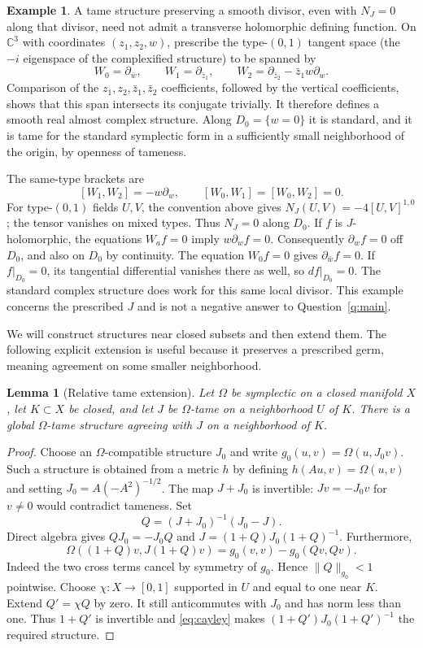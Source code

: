 \documentclass[11pt]{article}
\newtheorem{lemma}[theorem]{Lemma}
\theoremstyle{definition}
\newtheorem{example}[theorem]{Example}
\theoremstyle{remark}
\newcommand{\C}{\mathbb C}
\begin{document}
\begin{example}\label{ex:badJ}
A tame structure preserving a smooth divisor, even with $N_J=0$ along that divisor, need not admit a transverse holomorphic defining function.
On $\C^3$ with coordinates $(z_1,z_2,w)$, prescribe the type-$(0,1)$ tangent space (the $-i$ eigenspace of the complexified structure) to be spanned by
\[
 W_0=\partial_{\bar w},\qquad W_1=\partial_{\bar z_1},\qquad
 W_2=\partial_{\bar z_2}-\bar z_1w\partial_w.
\]
Comparison of the $z_1,z_2,\bar z_1,\bar z_2$ coefficients, followed by the vertical coefficients, shows that this span intersects its conjugate trivially. It therefore defines a smooth real almost complex structure. Along $D_0=\{w=0\}$ it is standard, and it is tame for the standard symplectic form in a sufficiently small neighborhood of the origin, by openness of tameness.

The same-type brackets are
\[
 [W_1,W_2]=-w\partial_w,\qquad [W_0,W_1]=[W_0,W_2]=0.
\]
For type-$(0,1)$ fields $U,V$, the convention above gives
$N_J(U,V)=-4[U,V]^{1,0}$; the tensor vanishes on mixed types. Thus $N_J=0$ along $D_0$. If $f$ is $J$-holomorphic, the equations $W_af=0$ imply $w\partial_wf=0$. Consequently $\partial_wf=0$ off $D_0$, and also on $D_0$ by continuity. The equation $W_0f=0$ gives $\partial_{\bar w}f=0$. If $f|_{D_0}=0$, its tangential differential vanishes there as well, so $df|_{D_0}=0$.
The standard complex structure does work for this same local divisor. This example concerns the prescribed $J$ and is not a negative answer to Question~\ref{q:main}.
\end{example}

We will construct structures near closed subsets and then extend them. The following explicit extension is useful because it preserves a prescribed germ, meaning agreement on some smaller neighborhood.

\begin{lemma}[Relative tame extension]\label{lem:extension}
Let $\Omega$ be symplectic on a closed manifold $X$, let $K\subset X$ be closed, and let $J$ be $\Omega$-tame on a neighborhood $U$ of $K$. There is a global $\Omega$-tame structure agreeing with $J$ on a neighborhood of $K$.
\end{lemma}
\begin{proof}
Choose an $\Omega$-compatible structure $J_0$ and write
$g_0(u,v)=\Omega(u,J_0v)$. Such a structure is obtained from a metric $h$ by defining $h(Au,v)=\Omega(u,v)$ and setting
$J_0=A(-A^2)^{-1/2}$.
The map $J+J_0$ is invertible: $Jv=-J_0v$ for $v\ne0$ would contradict tameness. Set
\[
 Q=(J+J_0)^{-1}(J_0-J).
\]
Direct algebra gives $QJ_0=-J_0Q$ and
$J=(1+Q)J_0(1+Q)^{-1}$. Furthermore,
\begin{equation}\label{eq:cayley}
 \Omega((1+Q)v,J(1+Q)v)=g_0(v,v)-g_0(Qv,Qv).
\end{equation}
Indeed the two cross terms cancel by symmetry of $g_0$. Hence $\|Q\|_{g_0}<1$ pointwise. Choose $\chi:X\to[0,1]$ supported in $U$ and equal to one near $K$. Extend $Q'=\chi Q$ by zero. It still anticommutes with $J_0$ and has norm less than one. Thus $1+Q'$ is invertible and \eqref{eq:cayley} makes
$(1+Q')J_0(1+Q')^{-1}$ the required structure.
\end{proof}
\end{document}
